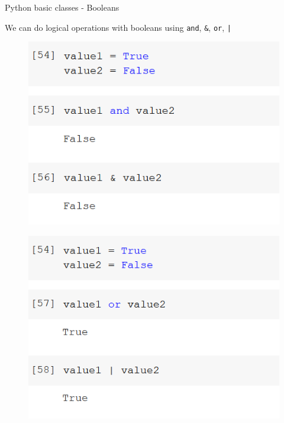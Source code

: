 \documentclass[aspectratio=169]{beamer}
\begin{document}
\begin{frame}{Python basic classes - Booleans}

	We can do logical operations with booleans using \texttt{and}, \texttt{\&}, \texttt{or}, \texttt{|}

	\begin{multicols}{2}

		\begin{figure}
			\centering
			\includegraphics[width=0.8\linewidth]{img/and.png}
		\end{figure}
		\begin{figure}
			\centering
			\includegraphics[width=0.8\linewidth]{img/or.png}
		\end{figure}

	\end{multicols}


\end{frame}
\end{document}
